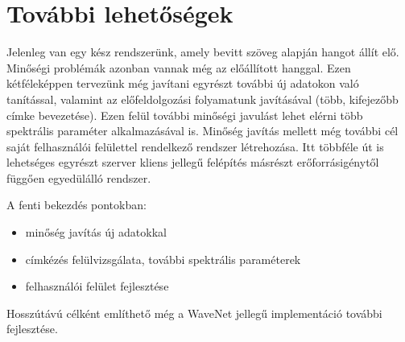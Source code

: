 \section{További lehetőségek}

Jelenleg van egy kész rendszerünk, amely bevitt szöveg alapján hangot állít elő. Minőségi problémák azonban vannak még az előállított hanggal. Ezen kétféleképpen tervezünk még javítani egyrészt további új adatokon való tanítással, valamint az előfeldolgozási folyamatunk javításával (több, kifejezőbb címke bevezetése). Ezen felül további minőségi javulást lehet elérni több spektrális paraméter alkalmazásával is. Minőség javítás mellett még további cél saját felhasználói felülettel rendelkező rendszer létrehozása. Itt többféle út is lehetséges egyrészt szerver kliens jellegű felépítés másrészt erőforrásigénytől függően egyedülálló rendszer. 

A fenti bekezdés pontokban:

\begin{itemize}
	\item minőség javítás új adatokkal
	\item címkézés felülvizsgálata, további spektrális paraméterek
	\item felhasználói felület fejlesztése
\end{itemize}

Hosszútávú célként említhető még a WaveNet jellegű implementáció további fejlesztése.
